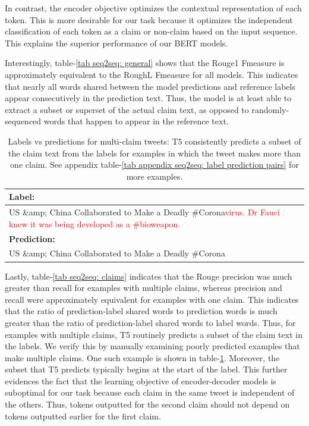 \documentclass[11pt]{article}
\begin{document}
In contrast, the encoder objective optimizes the contextual representation of each token. This is more desirable for our task because it optimizes the independent classification of each token as a claim or non-claim based on the input sequence. This explains the superior performance of our BERT models.

Interestingly, table-\ref{tab seq2seq: general} shows that the Rouge1 Fmeasure is approximately equivalent to the RoughL Fmeasure for all models. This indicates that nearly all words shared between the model predictions and reference labels appear consecutively in the prediction text. Thus, the model is at least able to extract a subset or superset of the actual claim text, as opposed to randomly-sequenced words that happen to appear in the reference text.

\begin{table}
    \begin{tabular}{p{2.8in}}
    \hline
    \textbf{Label: }\\
    \hline
    US \&amp; China Collaborated to Make a Deadly \#Corona\textcolor{red}{virus. Dr Fauci knew it was being developed as a \#bioweapon.} \\
    \hline
    \textbf{Prediction: } \\
    \hline
    US \&amp; China Collaborated to Make a Deadly \#Corona \\
    \hline
    
    \end{tabular}
    
    \caption{Labels vs predictions for multi-claim tweets: T5 consistently predicts a subset of the claim text from the labels for examples in which the tweet makes more than one claim. See appendix table-\ref{tab appendix seq2seq: label prediction pairs} for more examples.}
    \label{tab seq2seq: label prediction pairs}
\end{table}

Lastly, table-\ref{tab seq2seq: claims} indicates that the Rouge precision was much greater than recall for examples with multiple claims, whereas precision and recall were approximately equivalent for examples with one claim. This indicates that the ratio of prediction-label shared words to prediction words is much greater than the ratio of prediction-label shared words to label words. Thus, for examples with multiple claims, T5 routinely predicts a subset of the claim text in the labels. We verify this by manually examining poorly predicted examples that make multiple claims. One such example is shown in table-\ref{tab seq2seq: label prediction pairs}. Moreover, the subset that T5 predicts typically begins at the start of the label. This further evidences the fact that the learning objective of encoder-decoder models is suboptimal for our task because each claim in the same tweet is independent of the others. Thus, tokens outputted for the second claim should not depend on tokens outputted earlier for the first claim.
\end{document}
